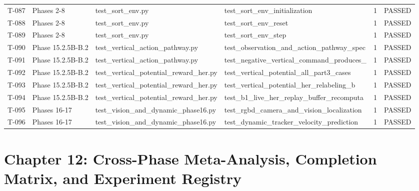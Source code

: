 \documentclass[11pt,a4paper,oneside]{book}
\begin{document}
\begin{longtable}{l l l l l l}
T-087 & Phases 2-8 & test\_sort\_env.py & test\_sort\_env\_initialization & 1 & PASSED \\
T-088 & Phases 2-8 & test\_sort\_env.py & test\_sort\_env\_reset & 1 & PASSED \\
T-089 & Phases 2-8 & test\_sort\_env.py & test\_sort\_env\_step & 1 & PASSED \\
T-090 & Phase 15.2.5B-B.2 & test\_vertical\_action\_pathway.py & test\_observation\_and\_action\_pathway\_spec & 1 & PASSED \\
T-091 & Phase 15.2.5B-B.2 & test\_vertical\_action\_pathway.py & test\_negative\_vertical\_command\_produces\_ & 1 & PASSED \\
T-092 & Phase 15.2.5B-B.2 & test\_vertical\_potential\_reward\_her.py & test\_vertical\_potential\_all\_part3\_cases & 1 & PASSED \\
T-093 & Phase 15.2.5B-B.2 & test\_vertical\_potential\_reward\_her.py & test\_vertical\_potential\_her\_relabeling\_b & 1 & PASSED \\
T-094 & Phase 15.2.5B-B.2 & test\_vertical\_potential\_reward\_her.py & test\_b1\_live\_her\_replay\_buffer\_recomputa & 1 & PASSED \\
T-095 & Phases 16-17 & test\_vision\_and\_dynamic\_phase16.py & test\_rgbd\_camera\_and\_vision\_localization & 1 & PASSED \\
T-096 & Phases 16-17 & test\_vision\_and\_dynamic\_phase16.py & test\_dynamic\_tracker\_velocity\_prediction & 1 & PASSED \\
\bottomrule \end{longtable}
\chapter{Chapter 12: Cross-Phase Meta-Analysis, Completion Matrix, and Experiment Registry}
\end{document}
